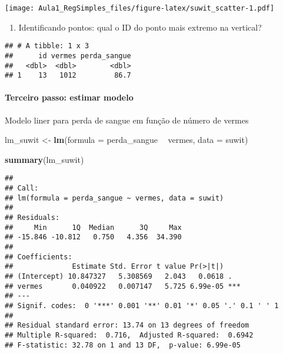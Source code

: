 \documentclass[]{article}
\newenvironment{Shaded}{\begin{snugshade}}{\end{snugshade}}
\newcommand{\DataTypeTok}[1]{\textcolor[rgb]{0.13,0.29,0.53}{#1}}
\newcommand{\DecValTok}[1]{\textcolor[rgb]{0.00,0.00,0.81}{#1}}
\newcommand{\KeywordTok}[1]{\textcolor[rgb]{0.13,0.29,0.53}{\textbf{#1}}}
\newcommand{\NormalTok}[1]{#1}
\newcommand{\OperatorTok}[1]{\textcolor[rgb]{0.81,0.36,0.00}{\textbf{#1}}}
\newcommand{\StringTok}[1]{\textcolor[rgb]{0.31,0.60,0.02}{#1}}
\providecommand{\tightlist}{%
  \setlength{\itemsep}{0pt}\setlength{\parskip}{0pt}}
\let\oldparagraph\paragraph
\renewcommand{\paragraph}[1]{\oldparagraph{#1}\mbox{}}
\begin{document}
\texttt{[image: Aula1\_RegSimples\_files/figure-latex/suwit\_scatter-1.pdf]}

\begin{enumerate}
\def\labelenumi{\arabic{enumi})}
\setcounter{enumi}{1}
\tightlist
\item
  Identificando pontos: qual o ID do ponto mais extremo na vertical?
\end{enumerate}

\begin{Shaded}
\end{Shaded}

\begin{verbatim}
## # A tibble: 1 x 3
##      id vermes perda_sangue
##   <dbl>  <dbl>        <dbl>
## 1    13   1012         86.7
\end{verbatim}

\hypertarget{terceiro-passo-estimar-modelo}{%
\paragraph{Terceiro passo: estimar
modelo}\label{terceiro-passo-estimar-modelo}}

Modelo liner para perda de sangue em função de número de vermes

\begin{Shaded}
\begin{Highlighting}[]
\NormalTok{lm_suwit <-}\StringTok{ }\KeywordTok{lm}\NormalTok{(}\DataTypeTok{formula =}\NormalTok{ perda_sangue }\OperatorTok{~}\StringTok{ }\NormalTok{vermes,}
                    \DataTypeTok{data =}\NormalTok{ suwit)}

\KeywordTok{summary}\NormalTok{(lm_suwit)}
\end{Highlighting}
\end{Shaded}

\begin{verbatim}
## 
## Call:
## lm(formula = perda_sangue ~ vermes, data = suwit)
## 
## Residuals:
##     Min      1Q  Median      3Q     Max 
## -15.846 -10.812   0.750   4.356  34.390 
## 
## Coefficients:
##              Estimate Std. Error t value Pr(>|t|)    
## (Intercept) 10.847327   5.308569   2.043   0.0618 .  
## vermes       0.040922   0.007147   5.725 6.99e-05 ***
## ---
## Signif. codes:  0 '***' 0.001 '**' 0.01 '*' 0.05 '.' 0.1 ' ' 1
## 
## Residual standard error: 13.74 on 13 degrees of freedom
## Multiple R-squared:  0.716,  Adjusted R-squared:  0.6942 
## F-statistic: 32.78 on 1 and 13 DF,  p-value: 6.99e-05
\end{verbatim}
\end{document}
